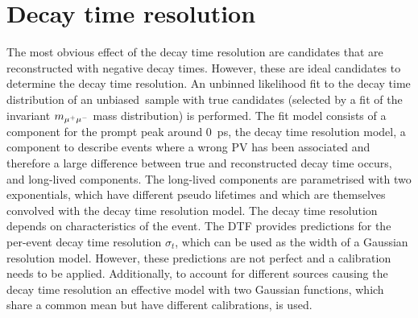 \section{Decay time resolution}
\label{sec:bd2jpsiks:decaytime:resolution}

The most obvious effect of the decay time resolution are candidates that are
reconstructed with negative decay times. However, these are ideal candidates
to determine the decay time resolution. An unbinned likelihood fit to the
decay time distribution of an unbiased~\BdToJPsiKS sample with true \jpsi
candidates (selected by a fit of the invariant $m_{{\mu^+\mu^-}}$ mass distribution)
is performed. The fit model consists of a component for the prompt peak around
\SI{0}{\ps}, \ie the decay time resolution model, a component to describe
events where a wrong PV has been associated and therefore a large difference
between true and reconstructed decay time occurs, and long-lived components.
The long-lived components are parametrised with two exponentials, which have
different pseudo lifetimes and which are themselves convolved with the decay
time resolution model. The decay time resolution depends on characteristics of
the event. The DTF provides predictions for the per-event decay time
resolution $\sigma_t$, which can be used as the width of a Gaussian resolution
model. However, these predictions are not perfect and a calibration needs to
be applied. Additionally, to account for different sources causing the decay
time resolution an effective model with two Gaussian functions, which share a
common mean but have different calibrations, is used.

